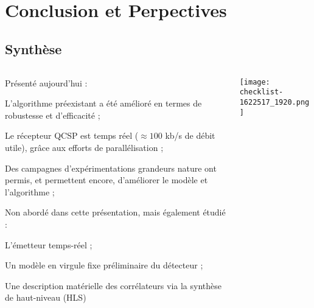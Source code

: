 \documentclass[../main.tex]{subfiles}
\begin{document}
\section{Conclusion et Perpectives}

\subsection{Synthèse}

\begin{frame}{\subsecname}
  \begin{columns}
    \begin{column}{.7 \linewidth}
      Présenté aujourd'hui :
      \begin{ctrlitemize}{.2 em} \small
        \item L'algorithme préexistant a été amélioré en termes de robustesse et d'efficacité ;
        \item Le  récepteur QCSP est temps réel ($\approx 100$ kb/s de débit utile), grâce aux efforts de parallélisation ;
        \item Des campagnes d'expérimentations grandeurs nature ont permis, et permettent encore, d'améliorer le modèle et l'algorithme ;
      \end{ctrlitemize} \vspace{1 em}

      Non abordé dans cette présentation, mais également étudié :
      \begin{ctrlitemize}{.2 em} \small
        \item L'émetteur temps-réel ;
        \item Un modèle en virgule fixe préliminaire du détecteur ;
        \item Une description matérielle des corrélateurs via la synthèse de haut-niveau (HLS) 
      \end{ctrlitemize}
    \end{column}
    \begin{column}{.3 \linewidth}
      \texttt{[image: checklist-1622517\_1920.png]}
    \end{column}
  \end{columns}
\end{frame}
\end{document}
